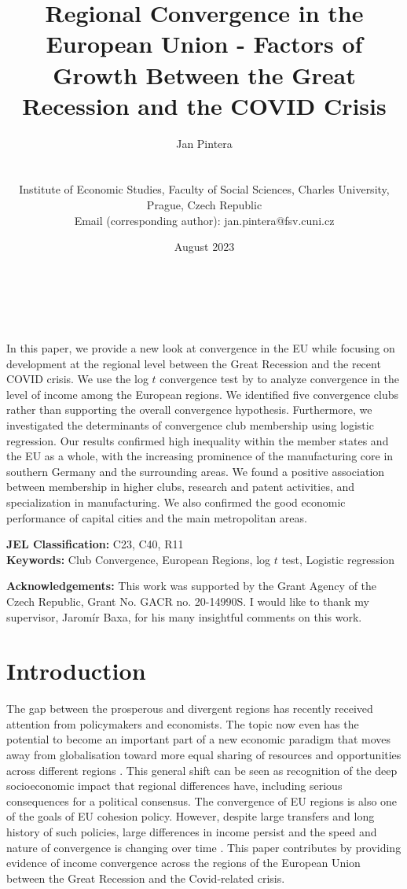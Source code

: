 \documentclass[11pt]{article}
\title{Regional Convergence in the European Union - Factors of Growth Between the Great Recession and the COVID Crisis}
\author{
        \begin{large}Jan Pintera\end{large} \\\vspace{5mm} \begin{small} Institute of Economic Studies, Faculty of Social Sciences, Charles University,\\ Prague, Czech Republic\\
        Email (corresponding author): jan.pintera@fsv.cuni.cz 
        \end{small}
}
\date{August 2023}
\makeatletter
\renewcommand{\maketitle}{\bgroup\setlength{\parindent}{0pt}
\begin{flushright}
  \textbf{\@title}\\
  \vspace{5mm}
  \@author\\
  \vspace{5mm}
  \@date
\end{flushright}\egroup
}
\renewenvironment{abstract}
 {\small
  \begin{flushleft}
  \bfseries \abstractname\vspace{-.5em}\vspace{0pt}
  \end{flushleft}
  \list{}{%
    \setlength{\leftmargin}{0mm}%
    \setlength{\rightmargin}{\leftmargin}%
  }%
  \item\relax}
 {\endlist}
\def \Keywords {Club Convergence, European Regions, log $t$ test, Logistic regression}
\makeatother
\begin{document}
\maketitle


\thispagestyle{empty}
\begin{abstract}
In this paper, we provide a new look at convergence in the EU while focusing on development at the regional level between the Great Recession and the recent COVID crisis. We use the log $t$ convergence test by \citet{phillips2007transition} to analyze convergence in the level of income among the European regions. We identified five convergence clubs rather than supporting the overall convergence hypothesis. Furthermore, we investigated the determinants of convergence club membership using logistic regression. Our results confirmed high inequality within the member states and the EU as a whole, with the increasing prominence of the manufacturing core in southern Germany and the surrounding areas. We found a positive association between membership in higher clubs, research and patent activities, and specialization in manufacturing. We also confirmed the good economic performance of capital cities and the main metropolitan areas.

\bigskip


\textbf{JEL Classification:} C23, C40, R11 \\
\textbf{Keywords:}  \Keywords \\

\bigskip

\textbf{Acknowledgements:} This work was supported by the Grant Agency of the Czech Republic, Grant No. GACR no. 20-14990S. I would like to thank my supervisor, Jaromír Baxa, for his many insightful comments on this work.

\end{abstract}
\clearpage
\setcounter{page}{1}

\section{Introduction}
The gap between the prosperous and divergent regions has recently received attention from policymakers and economists. The topic now even has the potential to become an important part of a new economic paradigm that moves away from globalisation toward more equal sharing of resources and opportunities across different regions \citep{rodrik_2022}. This general shift can be seen as recognition of the deep socioeconomic impact that regional differences have, including serious consequences for a political consensus. The convergence of EU regions is also one of the goals of EU cohesion policy. However, despite large transfers and long history of such policies, large differences in income persist and the speed and nature of convergence is changing over time \citep{eckey2007convergence,zarotiadis2013european, iammarino2019regional}.
This paper contributes by providing evidence of income convergence across the regions of the European Union between the Great Recession and the Covid-related crisis.
\end{document}
